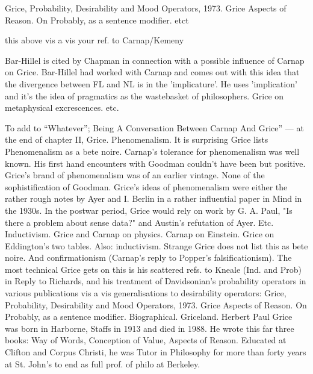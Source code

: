 \documentclass[10pt,titlepage]{book}
\begin{document}
Grice, Probability, Desirability and Mood Operators, 1973.
Grice Aspects of Reason. On Probably, as a sentence modifier. etct
 
this above vis a vis your ref. to Carnap/Kemeny
 
 
Bar-Hillel is cited by Chapman in connection with a possible influence of  
Carnap on Grice. Bar-Hillel had worked with Carnap and comes out with this 
idea  that the divergence between FL and NL is in the 'implicature'. He uses  
'implication' and it's the idea of pragmatics as the wastebasket of  
philosophers. Grice on metaphysical excrescences. etc. 
 
 
 To  add to 
“Whatever”;  Being  
A  Conversation Between Carnap And Grice” 
---  at the end of chapter II, Grice.  
Phenomenalism.  It is surprising Grice lists Phenomenalism as a bete 
noire. Carnap's tolerance  for phenomenalism was well known. His first hand 
encounters with Goodman  couldn't have been but positive. Grice's brand of 
phenomenalism was of an  earlier vintage. None of the sophistification of 
Goodman. Grice's ideas of  phenomenalism were either the rather rough notes by Ayer 
and I. Berlin in a  rather influential paper in Mind in the 1930s. In the 
postwar period, Grice  would rely on work by G. A. Paul, "Is there a problem 
about sense data?" and  Austin's refutation of Ayer. Etc. 
Inductivism.  Grice and Carnap on physics. Carnap on Einstein. Grice on 
Eddington's two  tables. Also: 
inductivism.  Strange Grice does not list this as bete noire. And 
confirmationism (Carnap's  reply to Popper's falsificationism). The most technical 
Grice gets on this is  his scattered refs. to Kneale (Ind. and Prob) in Reply 
to Richards, and his  treatment of Davidsonian's probability operators in 
various publications vis a  vis generalisations to desirability operators:  
Grice, Probability, Desirability and Mood  Operators, 1973. Grice Aspects of 
Reason. On Probably, as a sentence modifier.   
Biographical.  Griceland. Herbert Paul Grice was born in Harborne, Staffs 
in 1913 and died in  1988. He wrote this far three books: Way of Words, 
Conception of Value, Aspects  of Reason. Educated at Clifton and Corpus Christi, 
he was Tutor in Philosophy for more than forty years at St. John's to end 
as full prof. of philo at Berkeley.
\end{document}
